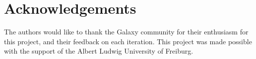 \documentclass[a4paper,num-refs]{oup-contemporary}
\begin{document}
\section{Acknowledgements}
The authors would like to thank the Galaxy community for their enthusiasm for this project, and their feedback on each iteration.
This project was made possible with the support of the Albert Ludwig University of Freiburg.


\end{document}
